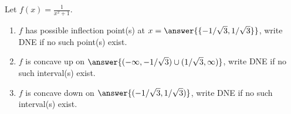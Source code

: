 \documentclass{ximera}
\author{Gregory Hartman \and Matthew Carr}
\begin{document}
\begin{exercise}




Let $f(x)=\frac{1}{x^2+1}$.
\begin{enumerate}
\item		$f$ has possible inflection point(s) at $x=\answer{\{-1/\sqrt{3},1/\sqrt{3}\}}$, write DNE if no such point(s) exist.
\item		$f$ is concave up on $\answer{(-\infty,-1/\sqrt{3})\cup(1/\sqrt{3},\infty)}$, write DNE if no such interval(s) exist.
\item		$f$ is concave down on $\answer{(-1/\sqrt{3},1/\sqrt{3})}$, write DNE if no such interval(s) exist.
\end{enumerate}

\end{exercise}
\end{document}
